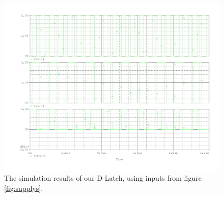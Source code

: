 \begin{figure}[h!]
	\centering
	\includegraphics[width=1\linewidth]{../images/spec_sim}
	\caption{The simulation results of our D-Latch, using inputs from figure \ref{fig:supplys}.}
	\label{fig:spec_sim}
\end{figure}

\FloatBarrier
